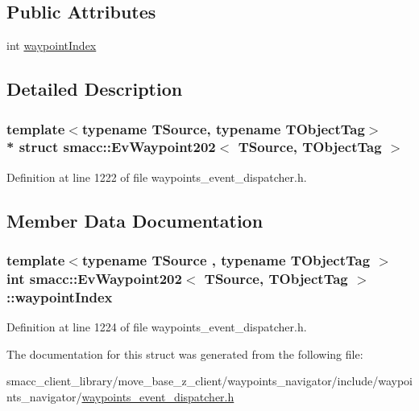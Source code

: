 \subsection*{Public Attributes}
\begin{DoxyCompactItemize}
\item 
int \hyperlink{structsmacc_1_1EvWaypoint202_a8b54223af0f4747dc3ca83f9245ec77c}{waypoint\+Index}
\end{DoxyCompactItemize}


\subsection{Detailed Description}
\subsubsection*{template$<$typename T\+Source, typename T\+Object\+Tag$>$\\*
struct smacc\+::\+Ev\+Waypoint202$<$ T\+Source, T\+Object\+Tag $>$}



Definition at line 1222 of file waypoints\+\_\+event\+\_\+dispatcher.\+h.



\subsection{Member Data Documentation}
\subsubsection[{\texorpdfstring{waypoint\+Index}{waypointIndex}}]{\setlength{\rightskip}{0pt plus 5cm}template$<$typename T\+Source , typename T\+Object\+Tag $>$ int {\bf smacc\+::\+Ev\+Waypoint202}$<$ T\+Source, T\+Object\+Tag $>$\+::waypoint\+Index}\hypertarget{structsmacc_1_1EvWaypoint202_a8b54223af0f4747dc3ca83f9245ec77c}{}\label{structsmacc_1_1EvWaypoint202_a8b54223af0f4747dc3ca83f9245ec77c}


Definition at line 1224 of file waypoints\+\_\+event\+\_\+dispatcher.\+h.



The documentation for this struct was generated from the following file\+:\begin{DoxyCompactItemize}
\item 
smacc\+\_\+client\+\_\+library/move\+\_\+base\+\_\+z\+\_\+client/waypoints\+\_\+navigator/include/waypoints\+\_\+navigator/\hyperlink{waypoints__event__dispatcher_8h}{waypoints\+\_\+event\+\_\+dispatcher.\+h}\end{DoxyCompactItemize}
